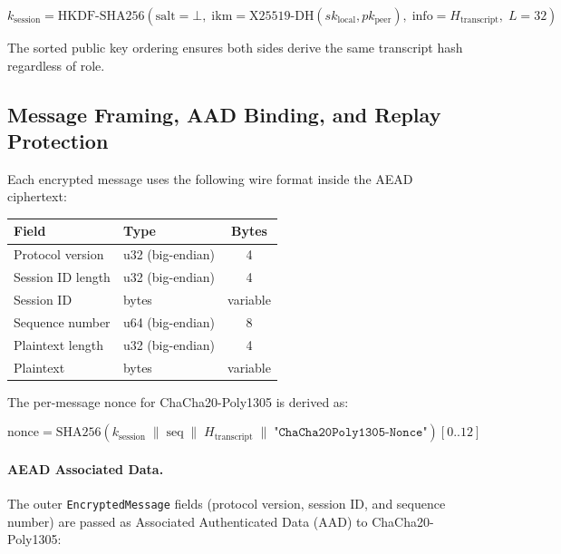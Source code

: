 \documentclass[11pt,a4paper]{article}
\begin{document}
\begin{equation}
\label{eq:session-key}
k_{\mathrm{session}} = \mathrm{HKDF\text{-}SHA256}\!\left(
  \mathrm{salt}{=}\bot,\;
  \mathrm{ikm}{=}\mathrm{X25519\text{-}DH}(sk_{\mathrm{local}}, pk_{\mathrm{peer}}),\;
  \mathrm{info}{=}H_{\mathrm{transcript}},\;
  L{=}32
\right)
\end{equation}

The sorted public key ordering ensures both sides derive the same transcript hash regardless of role.

\subsection{Message Framing, AAD Binding, and Replay Protection}

Each encrypted message uses the following wire format inside the AEAD ciphertext:

\begin{center}
\begin{tabular}{llc}
\hline
\textbf{Field} & \textbf{Type} & \textbf{Bytes} \\
\hline
Protocol version & u32 (big-endian) & 4 \\
Session ID length & u32 (big-endian) & 4 \\
Session ID & bytes & variable \\
Sequence number & u64 (big-endian) & 8 \\
Plaintext length & u32 (big-endian) & 4 \\
Plaintext & bytes & variable \\
\hline
\end{tabular}
\end{center}

The per-message nonce for ChaCha20-Poly1305 is derived as:

\begin{equation}
\label{eq:nonce}
\mathrm{nonce} = \mathrm{SHA256}\!\left(
  k_{\mathrm{session}} \;\|\;
  \mathrm{seq} \;\|\;
  H_{\mathrm{transcript}} \;\|\;
  \texttt{"ChaCha20Poly1305-Nonce"}
\right)[0..12]
\end{equation}

\paragraph{AEAD Associated Data.}
The outer \texttt{EncryptedMessage} fields (protocol version, session ID, and sequence number) are passed as Associated Authenticated Data (AAD) to ChaCha20-Poly1305:
\end{document}
